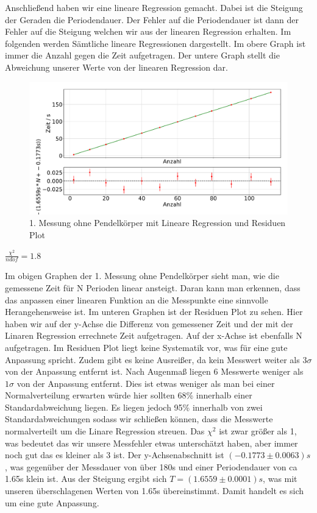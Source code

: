 \documentclass[twoside]{protokoll}
\begin{document}
Anschließend haben wir eine lineare Regression gemacht.
Dabei ist die Steigung der Geraden die Periodendauer.
Der Fehler auf die Periodendauer ist dann der Fehler auf die Steigung welchen wir aus der linearen Regression erhalten.
Im folgenden werden Sämtliche lineare Regressionen dargestellt.
Im obere Graph ist immer die Anzahl gegen die Zeit aufgetragen. 
Der untere Graph stellt die Abweichung unserer Werte von der linearen Regression dar. 
\begin{figure}[H]
    \centering
    \includegraphics[width=1.0\textwidth]{plots/lineare_regression_stange_1.pdf}
    \caption{1. Messung ohne Pendelkörper mit Lineare Regression und Residuen Plot}
\end{figure}
\begin{center}
    $ \frac{\chi^2}{ndof}  =  1.8$
\end{center}

Im obigen Graphen der 1. Messung ohne Pendelkörper sieht man, wie die gemessene Zeit für N Perioden linear ansteigt.
Daran kann man erkennen, dass das anpassen einer linearen Funktion an die Messpunkte eine sinnvolle Herangehensweise ist.
Im unteren Graphen ist der Residuen Plot zu sehen. Hier haben wir auf der y-Achse die Differenz von gemessener Zeit und der mit der Linaren Regression errechnete Zeit aufgetragen. 
Auf der x-Achse ist ebenfalls N aufgetragen.
Im Residuen Plot liegt keine Systematik vor, was für eine gute Anpassung spricht.
Zudem gibt es keine Ausreißer, da kein Messwert weiter als $3\sigma$ von der Anpassung entfernt ist.
Nach Augenmaß liegen 6 Messwerte weniger als $1\sigma$ von der Anpassung entfernt. Dies ist etwas weniger als man bei einer Normalverteilung erwarten würde hier sollten 68\% innerhalb einer Standardabweichung liegen. Es liegen jedoch 95\% innerhalb von zwei Standardabweichungen sodass wir schließen können, dass die Messwerte normalverteilt um die Linare Regression streuen.
Das $\chi^2$ ist zwar größer als 1, was bedeutet das wir unsere Messfehler etwas unterschätzt haben, aber immer noch gut das es kleiner als 3 ist.
Der y-Achsenabschnitt ist $ (-0.1773 \pm 0.0063)s$, was gegenüber der Messdauer von über 180s und einer Periodendauer von ca 1.65s  klein ist.
Aus der Steigung ergibt sich $T = (1.6559 \pm 0.0001)s$, was mit unseren überschlagenen Werten von 1.65s übereinstimmt.
Damit handelt es sich um eine gute Anpassung.
 
\end{document}
